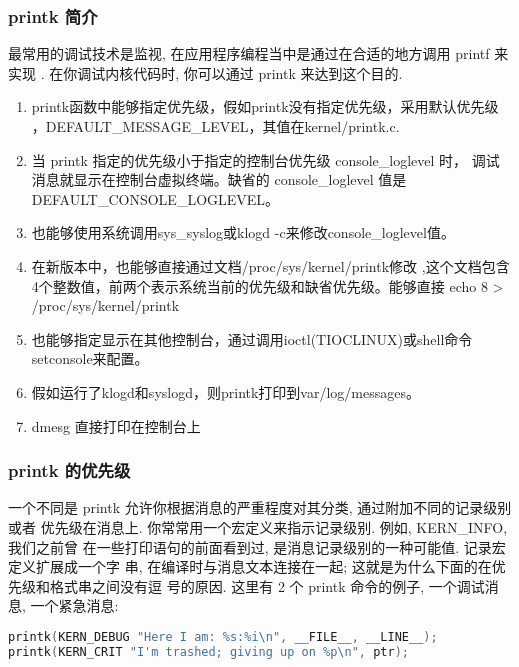 \documentclass[a4paper,titlepage]{article}
\begin{document}
\subsubsection{printk 简介}
最常用的调试技术是监视, 在应用程序编程当中是通过在合适的地方调用 printf 来实现
. 在你调试内核代码时, 你可以通过 printk 来达到这个目的.
\begin{enumerate}
    \item printk函数中能够指定优先级，假如printk没有指定优先级，采用默认优先级
        ，DEFAULT_MESSAGE_LEVEL，其值在kernel/printk.c.
    \item  当 printk 指定的优先级小于指定的控制台优先级 console_loglevel 时，
        调试消息就显示在控制台虚拟终端。缺省的 console_loglevel 值是
        DEFAULT_CONSOLE_LOGLEVEL。
    \item 也能够使用系统调用sys_syslog或klogd -c来修改console_loglevel值。
    \item 在新版本中，也能够直接通过文档/proc/sys/kernel/printk修改
        ,这个文档包含4个整数值，前两个表示系统当前的优先级和缺省优先级。能够直接
        echo 8 > /proc/sys/kernel/printk
    \item 也能够指定显示在其他控制台，通过调用ioctl(TIOCLINUX)或shell命令setconsole来配置。
    \item 假如运行了klogd和syslogd，则printk打印到var/log/messages。
    \item dmesg 直接打印在控制台上
\end{enumerate}

\subsubsection{printk 的优先级}
一个不同是 printk 允许你根据消息的严重程度对其分类, 通过附加不同的记录级别或者
优先级在消息上. 你常常用一个宏定义来指示记录级别. 例如, KERN_INFO, 我们之前曾
在一些打印语句的前面看到过, 是消息记录级别的一种可能值. 记录宏定义扩展成一个字
串, 在编译时与消息文本连接在一起; 这就是为什么下面的在优先级和格式串之间没有逗
号的原因. 这里有 2 个 printk 命令的例子, 一个调试消息, 一个紧急消息:
\begin{lstlisting}[language=c]
printk(KERN_DEBUG "Here I am: %s:%i\n", __FILE__, __LINE__);
printk(KERN_CRIT "I'm trashed; giving up on %p\n", ptr);
\end{lstlisting}
\end{document}
